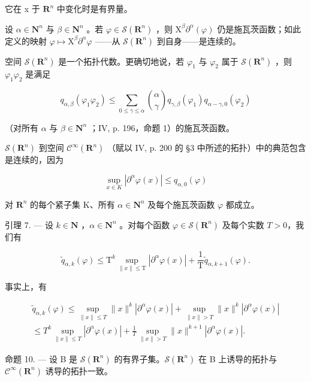 它在 x 于 \(\mathbf{R}^{n}\) 中变化时是有界量。

设 \(\alpha \in \mathbf{N}^n\) 与 \(\beta \in \mathbf{N}^n\) 。若 \(\varphi \in \mathcal{S}(\mathbf{R}^n)\) ，则 \(\mathrm{X}^{\beta}\partial^{\alpha}(\varphi)\) 仍是施瓦茨函数；如此定义的映射 \(\varphi \mapsto \mathrm{X}^{\beta}\partial^{\alpha}\varphi\) ——从 \(\mathcal{S}(\mathbf{R}^n)\) 到自身——是连续的。

空间 \(\mathcal{S}(\mathbf{R}^{n})\) 是一个拓扑代数。更确切地说，若 \(\varphi_{1}\) 与 \(\varphi_{2}\) 属于 \(\mathcal{S}(\mathbf{R}^{n})\) ，则 \(\varphi_{1}\varphi_{2}\) 是满足

\[
q _ {\alpha , \beta} (\varphi_ {1} \varphi_ {2}) \leqslant \sum_ {0 \leqslant \gamma \leqslant \alpha} \binom{\alpha}{\gamma} q _ {\gamma , \beta} (\varphi_ {1}) q _ {\alpha - \gamma , 0} (\varphi_ {2})\tag{2}
\]

（对所有 \(\alpha\) 与 \(\beta \in \mathbf{N}^n\) ；IV, p. 196，命题 1）的施瓦茨函数。

\(\mathcal{S}(\mathbf{R}^{n})\) 到空间 \(\mathcal{C}^{\infty}(\mathbf{R}^{n})\) （赋以 IV, p. 200 的 §3 中所述的拓扑）中的典范包含是连续的，因为

\[
\sup _ {x \in K} | \partial^ {\alpha} \varphi (x) | \leqslant q _ {\alpha , 0} (\varphi)
\]

对 \(\mathbf{R}^{n}\) 的每个紧子集 K、所有 \(\alpha \in \mathbf{N}^{n}\) 及每个施瓦茨函数 \(\varphi\) 都成立。

引理 7. --- 设 \(k \in \mathbf{N}\) ，\(\alpha \in \mathbf{N}^n\) 。对每个函数 \(\varphi \in \mathcal{S}(\mathbf{R}^n)\) 及每个实数 \(T > 0\)，我们有

\[
\widetilde {q} _ {\alpha , k} (\varphi) \leqslant \mathrm{T} ^ {k} \sup _ {\| x \| \leqslant \mathrm{T}} | \partial^ {\alpha} \varphi (x) | + \frac {1}{\mathrm{T}} \widetilde {q} _ {\alpha , k + 1} (\varphi).\tag{3}
\]

事实上，有

\[
\begin{array}{c} \widetilde {q} _ {\alpha , k} (\varphi) \leqslant \sup _ {\| x \| \leqslant T} \| x \| ^ {k} | \partial^ {\alpha} \varphi (x) | + \sup _ {\| x \| > T} \| x \| ^ {k} | \partial^ {\alpha} \varphi (x) | \\ \leqslant T ^ {k} \sup _ {\| x \| \leqslant T} | \partial^ {\alpha} \varphi (x) | + \frac {1}{T} \sup _ {\| x \| > T} \| x \| ^ {k + 1} | \partial^ {\alpha} \varphi (x) |. \end{array}
\]

命题 10. --- 设 B 是 \(\mathcal{S}(\mathbf{R}^{n})\) 的有界子集。\(\mathcal{S}(\mathbf{R}^{n})\) 在 B 上诱导的拓扑与 \(\mathcal{C}^{\infty}(\mathbf{R}^{n})\) 诱导的拓扑一致。

